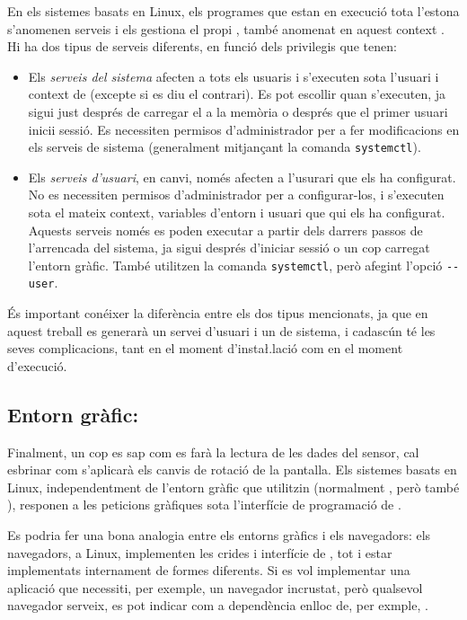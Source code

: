 En els sistemes basats en Linux, els programes que estan en execució tota
l'estona s'anomenen serveis i els gestiona el propi , també anomenat
en aquest context  \cite{Systemd}. Hi ha dos tipus de serveis diferents, en
funció dels privilegis que tenen:

\begin{itemize}
    \item Els \textit{serveis del sistema} afecten a tots els usuaris i
    s'executen sota l'usuari i context de  (excepte si es diu
    el contrari). Es pot escollir quan s'executen, ja sigui just després de
    carregar el  a la memòria o després que el primer usuari
    inicii sessió. Es necessiten permisos d'administrador per a fer modificacions
    en els serveis de sistema (generalment mitjançant la comanda
    \verb|systemctl|).
    \item Els \textit{serveis d'usuari}, en canvi, només afecten a l'usurari
    que els ha configurat. No es necessiten permisos d'administrador per a
    configurar-los, i s'executen sota el mateix context, variables d'entorn i
    usuari que qui els ha configurat. Aquests serveis només es poden executar a
    partir dels darrers passos de l'arrencada del sistema, ja sigui després
    d'iniciar sessió o un cop carregat l'entorn gràfic. També utilitzen la
    comanda \verb|systemctl|, però afegint l'opció \verb|--user|.
\end{itemize}

És important conéixer la diferència entre els dos tipus mencionats, ja que en
aquest treball es generarà un servei d'usuari i un de sistema, i cadascún té
les seves complicacions, tant en el moment d'insta\l.lació com en el moment
d'execució.

\subsection{Entorn gràfic: }

Finalment, un cop es sap com es farà la lectura de les dades del sensor, cal
esbrinar com s'aplicarà els canvis de rotació de la pantalla. Els sistemes
basats en Linux, independentment de l'entorn gràfic que utilitzin (normalment
, però també ), responen a les peticions gràfiques sota
l'interfície de programació de  \cite{Xlib}.

Es podria fer una bona analogia entre
els entorns gràfics i els navegadors: els navegadors, a Linux, implementen les
crides i interfície de , tot i estar implementats internament
de formes diferents. Si es vol implementar una aplicació que necessiti, per
exemple, un navegador incrustat, però qualsevol navegador serveix, es pot
indicar com a dependència  enlloc de, per exmple, .

